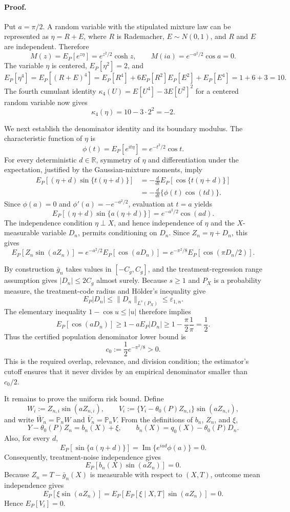 \paragraph{Proof.}
Put \(a=\pi/2\).  A random variable with the stipulated mixture law can be represented as \(\eta=R+E\), where \(R\) is Rademacher, \(E\sim N(0,1)\), and \(R\) and \(E\) are independent.  Therefore
\[
M(z)=E_P[e^{z\eta}]=e^{z^2/2}\cosh z,
\qquad
M(ia)=e^{-a^2/2}\cos a=0.
\]
The variable \(\eta\) is centered, \(E_P[\eta^2]=2\), and
\[
E_P[\eta^4]
=E_P[(R+E)^4]
=E_P[R^4]+6E_P[R^2]E_P[E^2]+E_P[E^4]
=1+6+3=10.
\]
The fourth cumulant identity \(\kappa_4(U)=E[U^4]-3E[U^2]^2\) for a centered random variable now gives
\[
\kappa_4(\eta)=10-3\cdot 2^2=-2.
\]

We next establish the denominator identity and its boundary modulus.  The characteristic function of \(\eta\) is
\[
\phi(t)=E_P[e^{it\eta}]=e^{-t^2/2}\cos t.
\]
For every deterministic \(d\in\mathbb R\), symmetry of \(\eta\) and differentiation under the expectation, justified by the Gaussian-mixture moments, imply
\[
\begin{aligned}
E_P[(\eta+d)\sin\{t(\eta+d)\}]
&=-\frac{d}{dt}E_P[\cos\{t(\eta+d)\}]\\
&=-\frac{d}{dt}\{\phi(t)\cos(td)\}.
\end{aligned}
\]
Since \(\phi(a)=0\) and \(\phi'(a)=-e^{-a^2/2}\), evaluation at \(t=a\) yields
\[
E_P[(\eta+d)\sin\{a(\eta+d)\}]
=e^{-a^2/2}\cos(ad).
\]
The independence condition \(\eta\perp X\), and hence independence of \(\eta\) and the \(X\)-measurable variable \(D_n\), permits conditioning on \(D_n\).  Since \(Z_n=\eta+D_n\), this gives
\[
E_P[Z_n\sin(aZ_n)]
=e^{-a^2/2}E_P[\cos(aD_n)]
=e^{-\pi^2/8}E_P[\cos(\pi D_n/2)].
\]

By construction \(\bar g_n\) takes values in \([-C_g,C_g]\), and the treatment-regression range assumption gives \(|D_n|\le2C_g\) almost surely.  Because \(s\ge1\) and \(P_X\) is a probability measure, the treatment-code radius and H\"older's inequality give
\[
E_P|D_n|\le \|D_n\|_{L^s(P_X)}\le\varepsilon_{1,n}.
\]
The elementary inequality \(1-\cos u\le |u|\) therefore implies
\[
E_P[\cos(aD_n)]
\ge1-aE_P|D_n|
\ge1-\frac{\pi}{2}\frac1\pi
=\frac12.
\]
Thus the certified population denominator lower bound is
\[
c_0:=\frac12e^{-\pi^2/8}>0.
\]
This is the required overlap, relevance, and division condition; the estimator's cutoff ensures that it never divides by an empirical denominator smaller than \(c_0/2\).

It remains to prove the uniform risk bound.  Define
\[
W_i:=Z_{n,i}\sin(aZ_{n,i}),
\qquad
V_i:=\{Y_i-\theta_0(P)Z_{n,i}\}\sin(aZ_{n,i}),
\]
and write \(\bar W_n=\mathbb P_nW\) and \(\bar V_n=\mathbb P_nV\).  From the definitions of \(b_n\), \(Z_n\), and \(\xi\),
\[
Y-\theta_0(P)Z_n=b_n(X)+\xi,
\qquad
b_n(X)=q_0(X)-\theta_0(P)D_n.
\]
Also, for every \(d\),
\[
E_P[\sin\{a(\eta+d)\}]
=\operatorname{Im}\{e^{iad}\phi(a)\}=0.
\]
Consequently, treatment-noise independence gives
\[
E_P[b_n(X)\sin(aZ_n)]=0.
\]
Because \(Z_n=T-\bar g_n(X)\) is measurable with respect to \((X,T)\), outcome mean independence gives
\[
E_P[\xi\sin(aZ_n)]
=E_P\!\left[E_P[\xi\mid X,T]\sin(aZ_n)\right]=0.
\]
Hence \(E_P[V_i]=0\).

